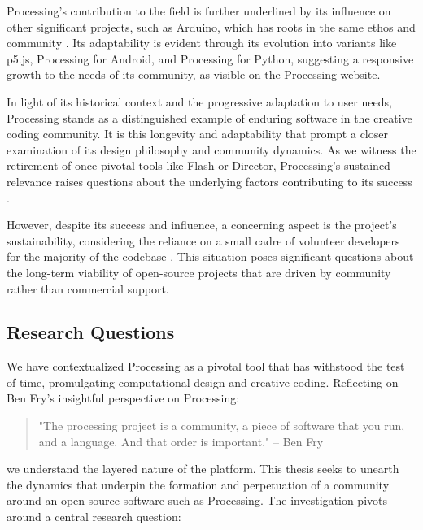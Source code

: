 Processing's contribution to the field is further underlined by its influence on other significant projects, such as Arduino, which has roots in the same ethos and community \parencite{barraganUntoldHistoryArduino2016}. Its adaptability is evident through its evolution into variants like p5.js, Processing for Android, and Processing for Python, suggesting a responsive growth to the needs of its community, as visible on the Processing website.

In light of its historical context and the progressive adaptation to user needs, Processing stands as a distinguished example of enduring software in the creative coding community. It is this longevity and adaptability that prompt a closer examination of its design philosophy and community dynamics. As we witness the retirement of once-pivotal tools like Flash or Director, Processing's sustained relevance raises questions about the underlying factors contributing to its success \parencite{hortonDeathTechnicalSkill} \parencite{steveThoughtsFlashApple2010} \parencite{FutureAdobeContribute2019}.

However, despite its success and influence, a concerning aspect is the project's sustainability, considering the reliance on a small cadre of volunteer developers for the majority of the codebase \parencite{fryModernPrometheusHistory2018}. This situation poses significant questions about the long-term viability of open-source projects that are driven by community rather than commercial support.

\subsection{Research Questions}

We have contextualized Processing as a pivotal tool that has withstood the test of time, promulgating computational design and creative coding. Reflecting on Ben Fry's insightful perspective on Processing:

\begin{quote}
"The processing project is a community, a piece of software that you run, and a language. And that order is important." – Ben Fry \parencite[19:22]{artsatmit2017CASTSymposium2017}
\end{quote}\label{fry_quote}

we understand the layered nature of the platform. This thesis seeks to unearth the dynamics that underpin the formation and perpetuation of a community around an open-source software such as Processing. The investigation pivots around a central research question:

